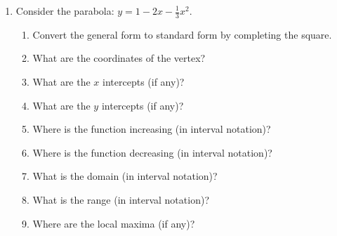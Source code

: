 \documentclass[letterpaper,12pt,fleqn]{article}
\begin{document}
\begin{enumerate}
\begin{enumerate}
    \bigskip

    \begin{figure}[h]
      \setlength{\leftskip}{1in}
    \end{figure}
  \end{enumerate}

  \newpage

\item Consider the parabola: $y=1-2x-\frac{1}{3}x^2$.
  \begin{enumerate}
  \item Convert the general form to standard form by completing the square.

    \vspace{3in}
    
  \item What are the coordinates of the vertex?

    \vspace{1in}

  \item What are the $x$ intercepts (if any)?

    \vspace{2in}
    
  \item What are the $y$ intercepts (if any)?

    \newpage
    
  \item Where is the function increasing (in interval notation)?

    \vspace{0.5in}
    
  \item Where is the function decreasing (in interval notation)?

    \vspace{0.5in}
    
  \item What is the domain (in interval notation)?

    \vspace{0.5in}

  \item What is the range (in interval notation)?

    \vspace{0.5in}
    
  \item Where are the local maxima (if any)?


\end{enumerate}
\end{enumerate}
\end{document}
